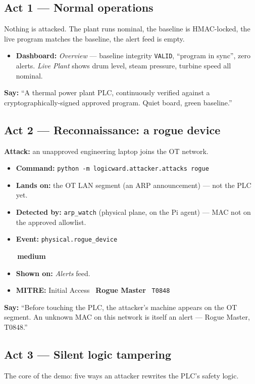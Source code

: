 \documentclass[11pt,a4paper]{article}
\newcommand{\code}[1]{\texttt{\small #1}}
\newcommand{\sev}[2]{\colorbox{#1}{\small\strut\,#2\,}}
\newcommand{\med}{\sev{medbg}{\color{warn}\textbf{medium}}}
\begin{document}
\subsection{Act 1 --- Normal operations}
Nothing is attacked. The plant runs nominal, the baseline is HMAC-locked, the live program
matches the baseline, the alert feed is empty.
\begin{itemize}[leftmargin=1.3em,itemsep=1pt]
  \item \textbf{Dashboard:} \emph{Overview} --- baseline integrity \code{VALID}, ``program
        in sync'', zero alerts. \emph{Live Plant} shows drum level, steam pressure, turbine
        speed all nominal.
\end{itemize}
\begin{say}\textbf{Say:} ``A thermal power plant PLC, continuously verified against a
cryptographically-signed approved program. Quiet board, green baseline.''\end{say}

\subsection{Act 2 --- Reconnaissance: a rogue device}
\textbf{Attack:} an unapproved engineering laptop joins the OT network.
\begin{itemize}[leftmargin=1.3em,itemsep=1pt]
  \item \textbf{Command:} \code{python -m logicward.attacker.attacks rogue}
  \item \textbf{Lands on:} the OT LAN segment (an ARP announcement) --- not the PLC yet.
  \item \textbf{Detected by:} \code{arp\_watch} (physical plane, on the Pi agent) --- MAC not
        on the approved allowlist.
  \item \textbf{Event:} \code{physical.rogue\_device} \quad\med
  \item \textbf{Shown on:} \emph{Alerts} feed.
  \item \textbf{MITRE:} Initial Access \textbullet\ \textbf{Rogue Master} \textbullet\ \code{T0848}
\end{itemize}
\begin{say}\textbf{Say:} ``Before touching the PLC, the attacker's machine appears on the
OT segment. An unknown MAC on this network is itself an alert --- Rogue Master, T0848.''\end{say}

\subsection{Act 3 --- Silent logic tampering}
The core of the demo: five ways an attacker rewrites the PLC's safety logic.
\end{document}

